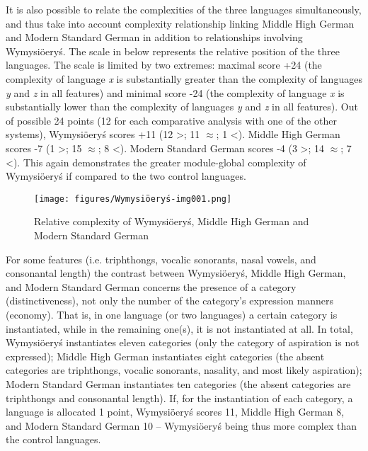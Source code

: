 \documentclass[output=paper,hidelinks]{langscibook}
\begin{document}
It is also possible to relate the complexities of the three languages simultaneously, and thus take into account complexity relationship linking Middle High German and Modern Standard German in addition to relationships involving Wymysiöeryś. The scale in  below represents the relative position of the three languages. The scale is limited by two extremes: maximal score +24 (the complexity of language \textit{x} is substantially greater than the complexity of languages \textit{y} and \textit{z} in all features) and minimal score -24 (the complexity of language \textit{x} is substantially lower than the complexity of languages \textit{y} and \textit{z} in all features). Out of possible 24 points (12 for each comparative analysis with one of the other systems), Wymysiöeryś scores +11 (12 >; 11 ${\approx}$; 1 <). Middle High German scores -7 (1 >; 15 ${\approx}$; 8 <). Modern Standard German scores -4 (3 >; 14 ${\approx}$; 7 <). This again demonstrates the greater module-global complexity of Wymysiöeryś if compared to the two control languages.

\begin{figure}
 \caption{Relative complexity of Wymysiöeryś, Middle High German and Modern Standard German}
 \texttt{[image: figures/Wymysiöeryś-img001.png]}
 \label{fig:Wymysiöeryś:1}
 \end{figure}

\largerpage
For some features (i.e. triphthongs, vocalic sonorants, nasal vowels, and consonantal length) the contrast between Wymysiöeryś, Middle High German, and Modern Standard German concerns the presence of a category (distinctiveness), not only the number of the category's expression manners (economy). That is, in one language (or two languages) a certain category is instantiated, while in the remaining one(s), it is not instantiated at all. In total, Wymysiöeryś instantiates eleven categories (only the category of aspiration is not expressed); Middle High German instantiates eight categories (the absent categories are triphthongs, vocalic sonorants, nasality, and most likely aspiration); Modern Standard German instantiates ten categories (the absent categories are triphthongs and consonantal length). If, for the instantiation of each category, a language is allocated 1 point, Wymysiöeryś scores 11, Middle High German 8, and Modern Standard German 10 – Wymysiöeryś being thus more complex than the control languages. 
\end{document}
